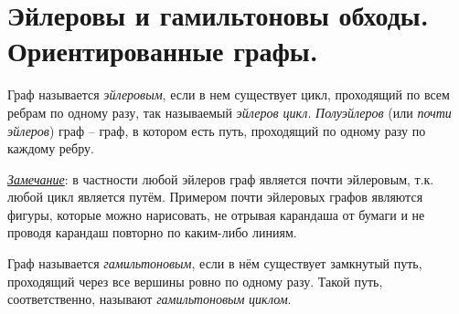 
\section{Эйлеровы и гамильтоновы обходы. Ориентированные графы.}

\begin{dfn}
    Граф называется \textit{эйлеровым}, если в нем существует цикл, проходящий по всем ребрам по одному разу, так называемый \textit{эйлеров цикл}. \textit{Полуэйлеров} (или \textit{почти эйлеров}) граф -- граф, в котором есть путь, проходящий по одному разу по каждому ребру.
\end{dfn}

\textit{\underline{Замечание}}: в частности любой эйлеров граф является почти эйлеровым, т.к. любой цикл является путём. Примером почти эйлеровых графов являются фигуры, которые можно нарисовать, не отрывая карандаша от бумаги и не проводя карандаш повторно по каким-либо линиям. 


\begin{dfn}
    Граф называется \textit{гамильтоновым}, если в нём существует замкнутый путь, проходящий через все вершины ровно по одному разу. Такой путь, соответственно, называют \textit{гамильтоновым} \textit{циклом}.
\end{dfn}


